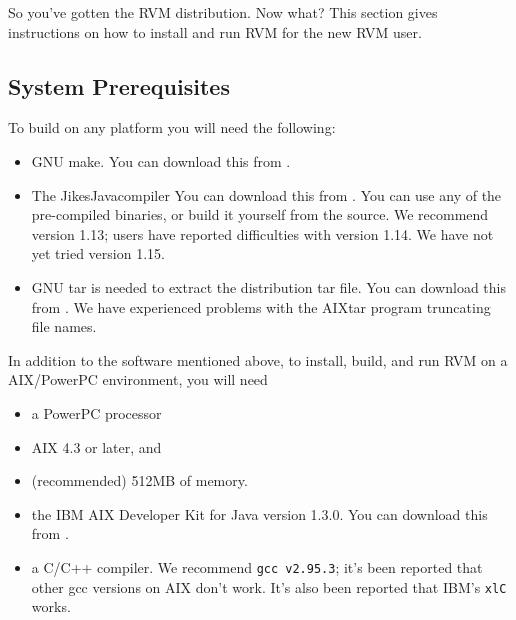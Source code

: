 So you've gotten the RVM distribution.  Now what?  This section gives
instructions on how to install and run RVM for the new RVM user.

\subsection{System Prerequisites}
To build on any platform you will need the following:
\begin{itemize}
\item GNU make. You can download this from
\xlink{{\tt \gnuMakeURL}} {\gnuMakeURL}.

\item The Jikes\trademark Java\trademark compiler 
You can download this from
\xlink{{\tt \jikesURL}} {\jikesURL}.
You can use any of the pre-compiled binaries, or build it yourself from the
source. We recommend version 1.13; users have reported difficulties with 
version 1.14.  We have not yet tried version 1.15.

\item GNU tar is needed to extract the distribution tar file.  
You can download this from
\xlink{{\tt \gnuTarURL}} {\gnuTarURL}.
We have experienced problems with the AIX\AIXTMFootnote tar program
truncating file names. 

\end{itemize}


In addition to the software mentioned above, to install, build, and
run RVM on a AIX/PowerPC environment, 
you will need 
\begin{itemize}
\item a PowerPC processor
\item AIX 4.3 or later, and
\item (recommended) 512MB of memory.
\item the IBM AIX Developer Kit for Java version 1.3.0.  You can
download this from \xlink{{\tt \AIXJdkURL}} {\AIXJdkURL}. 
\item a C/C++ compiler.  We recommend {\tt gcc v2.95.3}; it's been
reported that other gcc versions on AIX don't work.  It's also been
reported that IBM's {\tt xlC} works.
\end{itemize}

